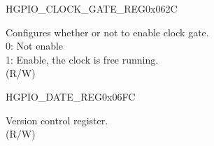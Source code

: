 \begin{register}{H}{GPIO\_CLOCK\_GATE\_REG}{0x062C}\label{regdesc:GPIOCLOCKGATEREG}
%
%
\regnewline%
\begin{regdesc}\begin{reglist}
\label{fielddesc:GPIOCLKEN}\item [GPIO\_CLK\_EN] Configures whether or not to enable clock gate.\\
0: Not enable\\
1: Enable, the clock is free running. \\
(R/W)
\end{reglist}\end{regdesc}
\end{register}


\begin{register}{H}{GPIO\_DATE\_REG}{0x06FC}\label{regdesc:GPIOREGDATEREG}
%
%
\regnewline%
\begin{regdesc}\begin{reglist}
\label{fielddesc:GPIOREGDATE}\item [GPIO\_DATE] Version control register. \\
(R/W)
\end{reglist}\end{regdesc}
\end{register}
